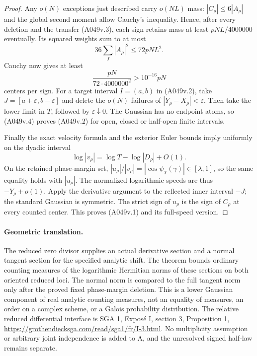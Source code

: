 \begin{proof}
Any $o(N)$ exceptions just described carry $o(NL)$ mass:
$|C_\rho|\le6|A_\rho|$ and the global second moment allow
Cauchy's inequality. Hence, after every deletion and the
transfer (A049v.3), each sign retains mass at least
$pNL/4000000$ eventually. Its squared weights sum to at
most
\[
             36\sum_J|A_\rho|^2\le72pNL^2.
\]
Cauchy now gives at least
\[
 \frac{pN}{72\cdot4000000^2}>10^{-16}pN
\tag{A049v.4}
\]
centers per sign. For a target interval $I=(a,b)$ in
(A049v.2), take $J=[a+\varepsilon,b-\varepsilon]$ and
delete the $o(N)$ failures of $|Y_\rho-X_\rho|<\varepsilon$.
Then take the lower limit in $T$, followed by
$\varepsilon\downarrow0$. The Gaussian has no endpoint
atoms, so (A049v.4) proves (A049v.2) for open, closed or
half-open finite intervals.

Finally the exact velocity formula and the exterior Euler
bounds imply uniformly on the dyadic interval
\[
 \log|v_\rho|=\log T-\log|D_\rho|+O(1).
\]
On the retained phase-margin set,
$|u_\rho|/|v_\rho|=|\cos\psi_\chi(\gamma)|\in[\lambda,1]$,
so the same equality holds with $|u_\rho|$. The normalized
logarithmic speeds are thus $-Y_\rho+o(1)$. Apply the
derivative argument to the reflected inner interval $-J$;
the standard Gaussian is symmetric. The strict sign of
$u_\rho$ is the sign of $C_\rho$ at every counted center.
This proves (A049v.1) and its full-speed version.
\end{proof}

\paragraph{Geometric translation.}
The reduced zero divisor supplies an actual derivative section
and a normal tangent section for the specified analytic shift.
The theorem bounds ordinary counting measures of the logarithmic
Hermitian norms of these sections on both oriented reduced loci.
The normal norm is compared to the full tangent norm only after
the proved fixed phase-margin deletion. This is a lower Gaussian
component of real analytic counting measures, not an equality
of measures, an order on a complex scheme, or a Galois probability
distribution. The relative reduced differential interface is
SGA 1, Expos\'e I, section 3, Proposition 1,
\url{https://grothendiecksga.com/read/sga1/fr/I-3.html}.
No multiplicity assumption or arbitrary joint independence is
added to A, and the unresolved signed half-law remains separate.


